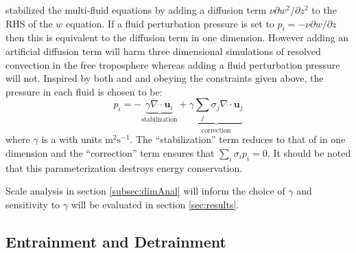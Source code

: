 \documentclass[draft]{agujournal2019}
\begin{document}
 stabilized the multi-fluid equations by adding a diffusion
term $\nu\partial w^{2}/\partial z^{2}$ to the RHS of the $w$ equation.
If a fluid perturbation pressure is set to $p_i=-\nu\partial w/\partial z$
then this is equivalent to the diffusion term in one dimension. However adding an artificial diffusion term will harm three dimensional simulations of
resolved convection in the free troposphere whereas adding a fluid
perturbation pressure will not. Inspired by both  and
and obeying the constraints given above, the pressure in each fluid is chosen to be:
\begin{equation}
p_{i}=
-\underbrace{\gamma\nabla\cdot\mathbf{u}_{i}}_{\text{stabilization}}
+
\underbrace{\gamma\sum_j \sigma_j\nabla\cdot\mathbf{u}_j}_{\text{correction}}
\label{eq:Pi_div}
\end{equation}
where $\gamma$ is a  with units $\text{m}^2 \text{s}^{-1}$. The ``stabilization'' term reduces to that of  in one dimension and the ``correction'' term ensures that $\sum_i \sigma_i p_i =0$. It should be noted that this parameterization destroys  energy conservation. 

Scale analysis in section
\ref{subsec:dimAnal} will inform the choice of $\gamma$ and sensitivity
to $\gamma$ will be evaluated in section \ref{sec:results}.

\subsection{Entrainment and Detrainment \label{subsec:Sij}}
\end{document}
